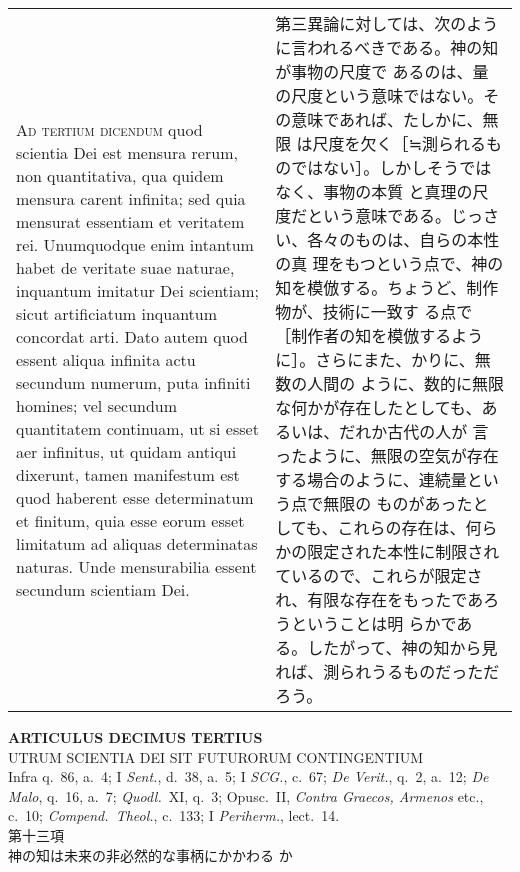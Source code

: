 \documentclass[10pt]{jsarticle} %
\begin{document}
\begin{longtable}{p{21em}p{21em}}
\\


{\scshape Ad tertium dicendum} quod scientia Dei est mensura rerum,
non quantitativa, qua quidem mensura carent infinita; sed quia
mensurat essentiam et veritatem rei. Unumquodque enim intantum habet
de veritate suae naturae, inquantum imitatur Dei scientiam; sicut
artificiatum inquantum concordat arti. Dato autem quod essent aliqua
infinita actu secundum numerum, puta infiniti homines; vel secundum
quantitatem continuam, ut si esset aer infinitus, ut quidam antiqui
dixerunt, tamen manifestum est quod haberent esse determinatum et
finitum, quia esse eorum esset limitatum ad aliquas determinatas
naturas. Unde mensurabilia essent secundum scientiam Dei.


&

第三異論に対しては、次のように言われるべきである。神の知が事物の尺度で
あるのは、量の尺度という意味ではない。その意味であれば、たしかに、無限
は尺度を欠く［≒測られるものではない］。しかしそうではなく、事物の本質
と真理の尺度だという意味である。じっさい、各々のものは、自らの本性の真
理をもつという点で、神の知を模倣する。ちょうど、制作物が、技術に一致す
る点で［制作者の知を模倣するように］。さらにまた、かりに、無数の人間の
ように、数的に無限な何かが存在したとしても、あるいは、だれか古代の人が
言ったように、無限の空気が存在する場合のように、連続量という点で無限の
ものがあったとしても、これらの存在は、何らかの限定された本性に制限され
ているので、これらが限定され、有限な存在をもったであろうということは明
らかである。したがって、神の知から見れば、測られうるものだっただろう。



\end{longtable}
\newpage



\begin{center}
{\Large {\bf ARTICULUS DECIMUS TERTIUS}}\\ {\large UTRUM SCIENTIA DEI
SIT FUTURORUM CONTINGENTIUM}\\ {\footnotesize Infra q.~86, a.~4; I
{\itshape Sent.}, d.~38, a.~5; I {\itshape SCG.}, c.~67; {\itshape De
Verit.}, q.~2, a.~12; {\itshape De Malo}, q.~16, a.~7; {\itshape
Quodl.}~XI, q.~3; Opusc.~II, {\itshape Contra Graecos, Armenos} etc.,
c.~10; {\itshape Compend.~Theol.}, c.~133; I {\itshape Periherm.},
lect.~14.}\\ {\Large 第十三項\\神の知は未来の非必然的な事柄にかかわる
か}
\end{center}
\end{document}
